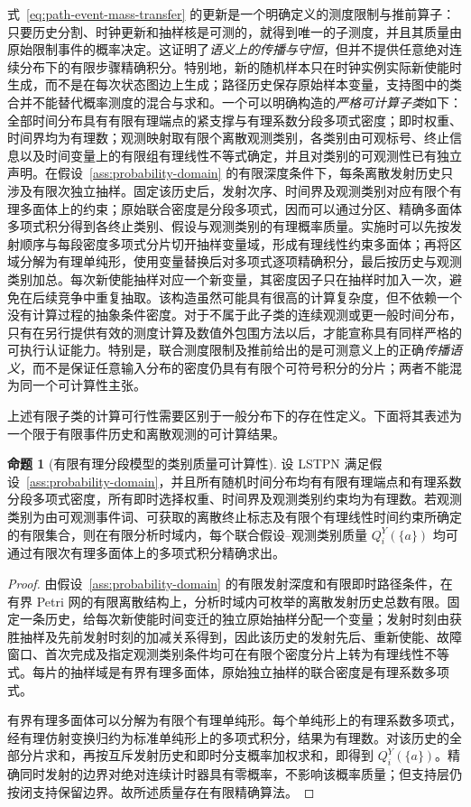 \documentclass[master,fontset=ubuntu]{shnuthesis}
\theoremstyle{definition}
\newtheorem{thesisproposition}{命题}
\begin{document}
式~\eqref{eq:path-event-mass-transfer} 的更新是一个明确定义的测度限制与推前算子：只要历史分割、时钟更新和抽样核是可测的，就得到唯一的子测度，并且其质量由原始限制事件的概率决定。这证明了\emph{语义上的传播与守恒}，但并不提供任意绝对连续分布下的有限步骤精确积分。特别地，新的随机样本只在时钟实例实际新使能时生成，而不是在每次状态图边上生成；路径历史保存原始样本变量，支持图中的类合并不能替代概率测度的混合与求和。一个可以明确构造的\emph{严格可计算子类}如下：全部时间分布具有有限有理端点的紧支撑与有理系数分段多项式密度；即时权重、时间界均为有理数；观测映射取有限个离散观测类别，各类别由可观标号、终止信息以及时间变量上的有限组有理线性不等式确定，并且对类别的可观测性已有独立声明。在假设~\ref{ass:probability-domain} 的有限深度条件下，每条离散发射历史只涉及有限次独立抽样。固定该历史后，发射次序、时间界及观测类别对应有限个有理多面体上的约束；原始联合密度是分段多项式，因而可以通过分区、精确多面体多项式积分得到各终止类别、假设与观测类别的有理概率质量。实施时可以先按发射顺序与每段密度多项式分片切开抽样变量域，形成有理线性约束多面体；再将区域分解为有理单纯形，使用变量替换后对多项式逐项精确积分，最后按历史与观测类别加总。每次新使能抽样对应一个新变量，其密度因子只在抽样时加入一次，避免在后续竞争中重复抽取。该构造虽然可能具有很高的计算复杂度，但不依赖一个没有计算过程的抽象条件密度。对于不属于此子类的连续观测或更一般时间分布，只有在另行提供有效的测度计算及数值外包围方法以后，才能宣称具有同样严格的可执行认证能力。特别是，联合测度限制及推前给出的是可测意义上的正确\emph{传播语义}，而不是保证任意输入分布的密度仍具有有限个可符号积分的分片；两者不能混为同一个可计算性主张。

上述有限子类的计算可行性需要区别于一般分布下的存在性定义。下面将其表述为一个限于有限事件历史和离散观测的可计算结果。

\begin{thesisproposition}[有限有理分段模型的类别质量可计算性]
\label{prop:finite-rational-mass}
设 LSTPN 满足假设~\ref{ass:probability-domain}，并且所有随机时间分布均有有限有理端点和有理系数分段多项式密度，所有即时选择权重、时间界及观测类别约束均为有理数。若观测类别为由可观测事件词、可获取的离散终止标志及有限个有理线性时间约束所确定的有限集合，则在有限分析时域内，每个联合假设--观测类别质量 \(Q_i^Y(\{a\})\) 均可通过有限次有理多面体上的多项式积分精确求出。
\end{thesisproposition}

\begin{proof}
由假设~\ref{ass:probability-domain} 的有限发射深度和有限即时路径条件，在有界 Petri 网的有限离散结构上，分析时域内可枚举的离散发射历史总数有限。固定一条历史，给每次新使能时间变迁的独立原始抽样分配一个变量；发射时刻由获胜抽样及先前发射时刻的加减关系得到，因此该历史的发射先后、重新使能、故障窗口、首次完成及指定观测类别条件均可在有限个密度分片上转为有理线性不等式。每片的抽样域是有界有理多面体，原始独立抽样的联合密度是有理系数多项式。

有界有理多面体可以分解为有限个有理单纯形。每个单纯形上的有理系数多项式，经有理仿射变换归约为标准单纯形上的多项式积分，结果为有理数。对该历史的全部分片求和，再按互斥发射历史和即时分支概率加权求和，即得到 \(Q_i^Y(\{a\})\)。精确同时发射的边界对绝对连续计时器具有零概率，不影响该概率质量；但支持层仍按闭支持保留边界。故所述质量存在有限精确算法。
\end{proof}
\end{document}
